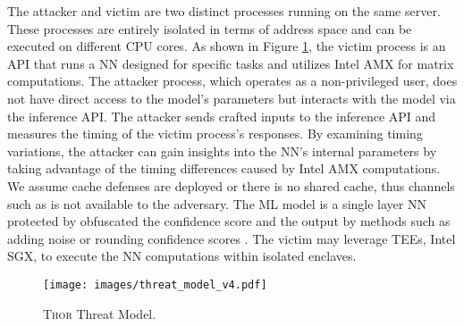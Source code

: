 The attacker and victim are two distinct processes running on the same server. These processes are entirely isolated in terms of address space and can be executed on different CPU cores. As shown in Figure \ref{fig:Thor-threat-model}, the victim process is an API that runs a NN designed for specific tasks and utilizes Intel AMX for matrix computations. The attacker process, which operates as a non-privileged user, does not have direct access to the model’s parameters but interacts with the model via the inference API. The attacker sends crafted inputs to the inference API and measures the timing of the victim process's responses. By examining timing variations, the attacker can gain insights into the NN's internal parameters by taking advantage of the timing differences caused by Intel AMX computations. We assume cache defenses are deployed or there is no shared cache,  thus channels such as \cite{Yan2020Cachetelepathy} is not available to the adversary. The ML model is a single layer NN protected by obfuscated the confidence score and the output by methods such as adding noise or rounding confidence scores \cite{Fredrikson2015ModelInversion}. The victim may leverage TEEs, Intel SGX, to execute the NN computations within isolated enclaves.



\begin{figure}[!ht] %
    \centering
   \texttt{[image: images/threat\_model\_v4.pdf]} 
    \caption{\textsc{Thor} Threat Model.}
    \label{fig:Thor-threat-model}
\end{figure}

